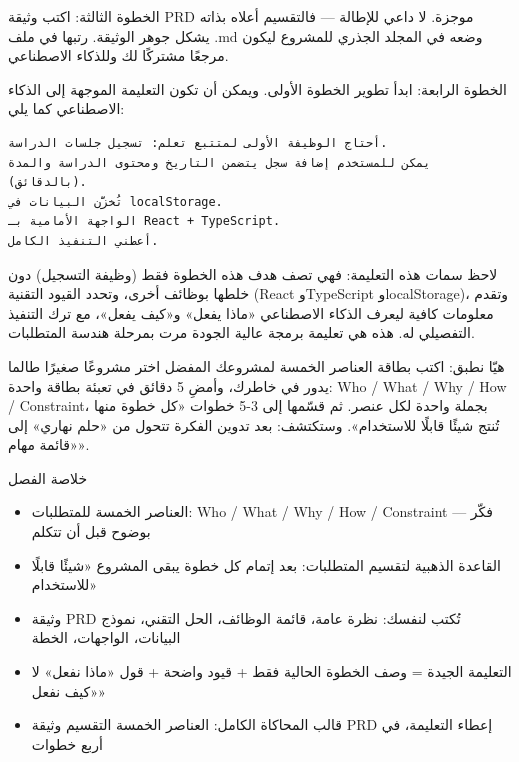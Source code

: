 الخطوة الثالثة: اكتب وثيقة PRD موجزة. لا داعي للإطالة — فالتقسيم أعلاه بذاته يشكل جوهر الوثيقة. رتبها في ملف .md وضعه في المجلد الجذري للمشروع ليكون مرجعًا مشتركًا لك وللذكاء الاصطناعي.

الخطوة الرابعة: ابدأ تطوير الخطوة الأولى. ويمكن أن تكون التعليمة الموجهة إلى الذكاء الاصطناعي كما يلي:

\begin{lstlisting}
أحتاج الوظيفة الأولى لمتتبع تعلم: تسجيل جلسات الدراسة.
يمكن للمستخدم إضافة سجل يتضمن التاريخ ومحتوى الدراسة والمدة (بالدقائق).
تُخزَّن البيانات في localStorage.
الواجهة الأمامية بـ React + TypeScript.
أعطني التنفيذ الكامل.
\end{lstlisting}

لاحظ سمات هذه التعليمة: فهي تصف هدف هذه الخطوة فقط (وظيفة التسجيل) دون خلطها بوظائف أخرى، وتحدد القيود التقنية (React وTypeScript وlocalStorage)، وتقدم معلومات كافية ليعرف الذكاء الاصطناعي «ماذا يفعل» و«كيف يفعل»، مع ترك التنفيذ التفصيلي له. هذه هي تعليمة برمجة عالية الجودة مرت بمرحلة هندسة المتطلبات.

\begin{tcbpractice}{هيّا نطبق: اكتب بطاقة العناصر الخمسة لمشروعك المفضل}
اختر مشروعًا صغيرًا طالما يدور في خاطرك، وأمضِ 5 دقائق في تعبئة بطاقة واحدة: Who / What / Why / How / Constraint، بجملة واحدة لكل عنصر. ثم قسّمها إلى 3-5 خطوات «كل خطوة منها تُنتج شيئًا قابلًا للاستخدام». وستكتشف: بعد تدوين الفكرة تتحول من «حلم نهاري» إلى «قائمة مهام».

\end{tcbpractice}

\begin{tcbsummary}{خلاصة الفصل}
\begin{itemize}
  \item العناصر الخمسة للمتطلبات: Who / What / Why / How / Constraint — فكّر بوضوح قبل أن تتكلم
  \item القاعدة الذهبية لتقسيم المتطلبات: بعد إتمام كل خطوة يبقى المشروع «شيئًا قابلًا للاستخدام»
  \item وثيقة PRD تُكتب لنفسك: نظرة عامة، قائمة الوظائف، الحل التقني، نموذج البيانات، الواجهات، الخطة
  \item التعليمة الجيدة = وصف الخطوة الحالية فقط + قيود واضحة + قول «ماذا نفعل» لا «كيف نفعل»
  \item قالب المحاكاة الكامل: العناصر الخمسة التقسيم وثيقة PRD إعطاء التعليمة، في أربع خطوات
\end{itemize}

\end{tcbsummary}
